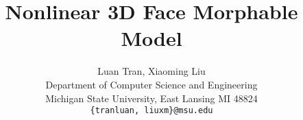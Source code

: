 \documentclass[10pt,twocolumn,letterpaper]{article}
\begin{document}
\title{Nonlinear 3D Face Morphable Model}

\author{Luan Tran, Xiaoming Liu \\
Department of Computer Science and Engineering \\
Michigan State University, East Lansing MI 48824\\
{\tt \{tranluan, liuxm\}@msu.edu}
}

\maketitle











{\small


}
\end{document}
